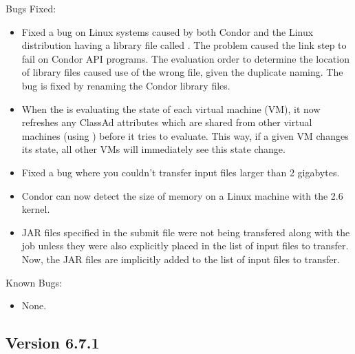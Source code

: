 \noindent Bugs Fixed:

\begin{itemize}

\item Fixed a bug on Linux systems caused by both 
      Condor and the Linux distribution having a library file 
      called .
      The problem caused the link step to fail on Condor API
      programs.
      The evaluation order to determine the location of library
      files caused use of the wrong file, given the duplicate naming.
      The bug is fixed by renaming the Condor library files.

\item When the  is evaluating the state of each virtual
  machine (VM), it now refreshes any ClassAd attributes which are
  shared from other virtual machines (using )
  before it tries to evaluate.
  This way, if a given VM changes its state, all other VMs will
  immediately see this state change.

\item Fixed a bug where you couldn't transfer input files larger than 2 gigabytes.

\item Condor can now detect the size of memory on a Linux machine with the 2.6
kernel.

\item JAR files specified in the submit file were not being transfered
along with the job unless they were also explicitly placed in the list
of input files to transfer. Now, the JAR files are implicitly added to the
list of input files to transfer.

\end{itemize}

\noindent Known Bugs:

\begin{itemize}

\item None.

\end{itemize}




\subsection{\label{sec:New-6-7-1}Version 6.7.1}

